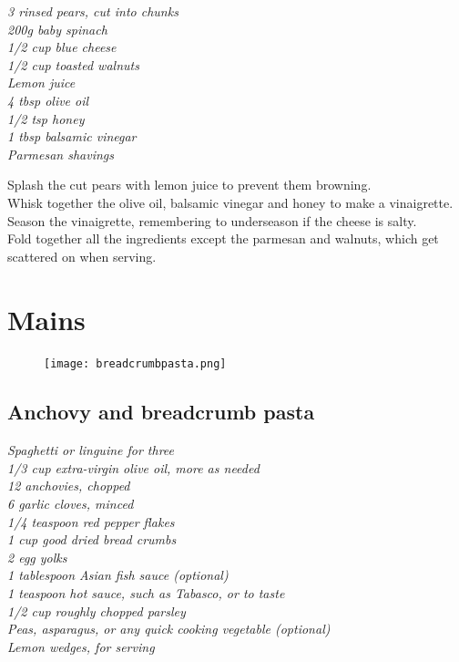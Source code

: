 \documentclass{tufte-book}
\begin{document}
\emph{3 rinsed pears, cut into chunks
\\200g baby spinach
\\1/2 cup blue cheese
\\1/2 cup toasted walnuts
\\Lemon juice
\\4 tbsp olive oil
\\1/2 tsp honey
\\1 tbsp balsamic vinegar
\\Parmesan shavings
}

Splash the cut pears with lemon juice to prevent them browning.
\\Whisk together the olive oil, balsamic vinegar and honey to make a vinaigrette.
\\Season the vinaigrette, remembering to underseason if the cheese is salty.
\\Fold together all the ingredients except the parmesan and walnuts, which get scattered on when serving.

\chapter{Mains}

\begin{figure}[h]
  \texttt{[image: breadcrumbpasta.png]}
\end{figure}

\section{Anchovy and breadcrumb pasta }

\emph{Spaghetti or linguine for three
\\1/3 cup extra-virgin olive oil, more as needed
\\12 anchovies, chopped
\\6 garlic cloves, minced
\\1/4 teaspoon red pepper flakes
\\1 cup good dried bread crumbs
\\2 egg yolks
\\1 tablespoon Asian fish sauce (optional)
\\1 teaspoon hot sauce, such as Tabasco, or to taste
\\1/2 cup roughly chopped parsley
\\ Peas, asparagus, or any quick cooking vegetable (optional)
\\Lemon wedges, for serving}
\end{document}
